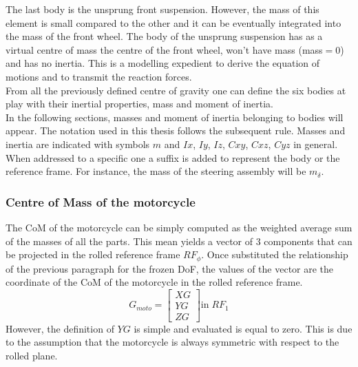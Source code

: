 %
The last body is the unsprung front suspension. However, the mass of this element is small compared to the other and it can be eventually integrated into the mass of the front wheel. The body of the unsprung suspension has as a virtual centre of mass the centre of the front wheel, won't have mass (mass$=0$) and has no inertia. This is a modelling expedient to derive the equation of motions and to transmit the reaction forces.\\
From all the previously defined centre of gravity one can define the six bodies at play with their inertial properties, mass and moment of inertia.\\
In the following sections, masses and moment of inertia belonging to bodies will appear. The notation used in this thesis follows the subsequent rule. Masses and inertia are indicated with symbols $m$ and $Ix$, $Iy$, $Iz$, $Cxy$, $Cxz$, $Cyz$ in general. When addressed to a specific one a suffix is added to represent the body or the reference frame. For instance, the mass of the steering assembly will be $m_\delta$.
%
\subsubsection{Centre of Mass of the motorcycle}
%
The CoM of the motorcycle can be simply computed as the weighted average sum of the masses of all the parts. This mean yields a vector of 3 components that can be projected in the rolled reference frame $RF_\phi$. Once substituted the relationship of the previous paragraph for the frozen DoF, the values of the vector are the coordinate of the CoM of the motorcycle in the rolled reference frame. 
\begin{equation}
    \label{eq:CoM}
    G_{moto} = 
    \left[ \begin{array}{c}
        XG\\
        YG\\
        ZG
    \end{array} \right]
    \text{in} \; RF_1
\end{equation}
However, the definition of $YG$ is simple and evaluated is equal to zero. This is due to the assumption that the motorcycle is always symmetric with respect to the rolled plane.
%
